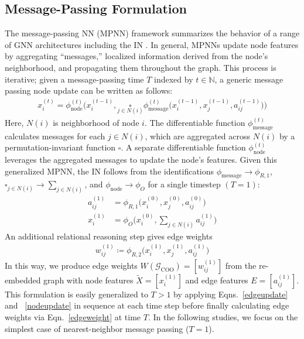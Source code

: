 \documentclass[twocolumn]{svjour3}
\begin{document}
\subsection{Message-Passing Formulation}\label{messagepassingformulation}
The message-passing NN (MPNN) framework summarizes the behavior of a range of GNN architectures including the IN \cite{gilmer2017neural}. 
In general, MPNNs update node features by aggregating ``messages,'' localized information derived from the node's neighborhood, and propagating them throughout the graph. 
This process is iterative; given a message-passing time $T$ indexed by $t\in\mathbb{N}$, a generic message passing node update can be written as follows: 
\begin{align}
    x^{(t)}_{i} = \phi_\mathrm{node}^{(t)}\bigg( x_i^{(t-1)}, \underset{j\in N(i)}{\square} \phi_\mathrm{message}^{(t)}\big(x_i^{(t-1)}, x_j^{(t-1)}, a_{ij}^{(t-1)} \big)  \bigg)
\end{align}
Here, $N(i)$ is neighborhood of node $i$. 
The differentiable function $\phi_\mathrm{message}^{(t)}$ calculates messages for each $j\in N(i)$, which are aggregated across $N(i)$ by a permutation-invariant function $\square$. 
A separate differentiable function $\phi_\mathrm{node}^{(t)}$ leverages the aggregated messages to update the node's features. 
Given this generalized MPNN, the IN follows from the identifications $\phi_\mathrm{message}\rightarrow \phi_{R,1}$, $\square_{j\in N(i)}\rightarrow \sum_{j\in N(i)}$, and $\phi_\mathrm{node}\rightarrow \phi_{O}$ for a single timestep $(T=1)$:
\begin{align}
    a_{ij}^{(1)} &= \phi_{R,1}\big(x_i^{(0)}, x_j^{(0)}, a_{ij}^{(0)} \big)\label{edgeupdate}\\
    x^{(1)}_{i} &= \phi_{O}\bigg(x_i^{(0)}, \underset{j\in N(i)}{\sum}a_{ij}^{(1)} \bigg)\label{nodeupdate}
\end{align}
An additional relational reasoning step gives edge weights
\begin{align}
    w_{ij}^{(1)} \coloneqq \phi_{R,2}\big(x_i^{(1)}, x_j^{(1)}, a_{ij}^{(1)}\big)\label{edgeweight}
\end{align}
In this way, we produce edge weights $W(\mathcal{G}_\mathrm{COO})=[w_{ij}^{(1)}]$ from the re-embedded graph with node features $\tilde{X}=[x_i^{(1)}]$ and edge features $E=[a_{ij}^{(1)}]$. 
This formulation is easily generalized to $T>1$ by applying Eqns.~\ref{edgeupdate} and ~\ref{nodeupdate} in sequence at each time step before finally calculating edge weights via Eqn.~\ref{edgeweight} at time $T$. 
In the following studies, we focus on the simplest case of nearest-neighbor message passing ($T=1$). 
\end{document}
